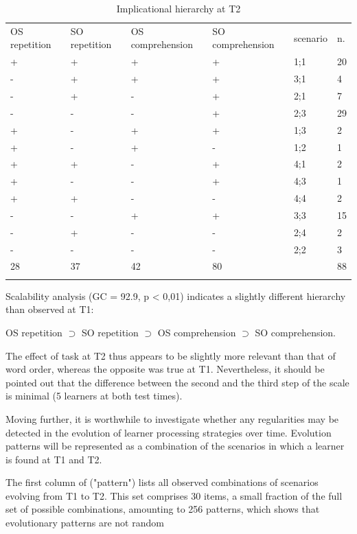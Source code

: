 \begin{table}
    \begin{tabularx}{\textwidth}{XXXXXX}
    \lsptoprule
     OS repetition & SO repetition & OS comprehension & SO comprehension & scenario & n. \\
     + & + & + & + & 1;1 & 20\\
     {}- & + & + & + & 3;1 & 4\\
     {}- & + & {}- & + & 2;1 & 7\\
     {}- & {}- & {}- & + & 2;3 & 29\\
     + & {}- & + & + & 1;3 & 2\\
     + & {}- & + & {}- & 1;2 & 1\\
     + & + & {}- & + & 4;1 & 2\\
     + & {}- & {}- & + & 4;3 & 1\\
     + & + & {}- & {}- & 4;4 & 2\\
     {}- & {}- & + & + & 3;3 & 15\\
     {}- & + & {}- & {}- & 2;4 & 2\\
     {}- & {}- & {}- & {}- & 2;2 & 3\\
     28 & 37 & 42 & 80 &  & 88\\
    \lspbottomrule
    \end{tabularx}
    \caption{Implicational hierarchy at T2}
    \label{tab:06:5}
\end{table}

Scalability analysis (GC = 92.9, p < 0,01) indicates a slightly different hierarchy than observed at T1:

OS repetition ${\supset}$ SO repetition ${\supset}$ OS comprehension ${\supset}$ SO comprehension. 

The effect of task at T2 thus appears to be slightly more relevant than that of word order, whereas the opposite was true at T1. Nevertheless, it should be pointed out that the difference between the second and the third step of the scale is minimal (5 learners at both test times).

Moving further, it is worthwhile to investigate whether any regularities may be detected in the evolution of learner processing strategies over time. Evolution patterns will be represented as a combination of the scenarios in which a learner is found at T1 and T2. 

The first column of  ("pattern") lists all observed combinations of scenarios evolving from T1 to T2. This set comprises 30 items, a small fraction of the full set of possible combinations, amounting to 256 patterns, which shows that evolutionary patterns are not random

